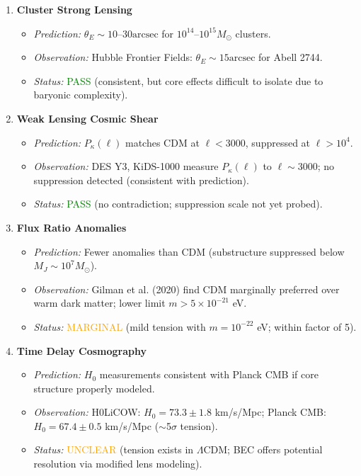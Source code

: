 \documentclass[11pt,a4paper]{article}
\newcommand{\Msun}{\ensuremath{M_\odot}}
\newcommand{\arcsec}{\ensuremath{\text{arcsec}}}
\theoremstyle{definition}
\theoremstyle{remark}
\begin{document}
\begin{enumerate}[leftmargin=*, label=\textbf{Criterion \arabic*:}, itemsep=0.5em]
\item \textbf{Cluster Strong Lensing}
\begin{itemize}[leftmargin=*, itemsep=0.2em]
\item \emph{Prediction:} $\theta_E \sim 10$--$30\arcsec$ for $10^{14}$--$10^{15} \Msun$ clusters.
\item \emph{Observation:} Hubble Frontier Fields: $\theta_E \sim 15\arcsec$ for Abell 2744.
\item \emph{Status:} \textcolor{green}{PASS} (consistent, but core effects difficult to isolate due to baryonic complexity).
\end{itemize}

\item \textbf{Weak Lensing Cosmic Shear}
\begin{itemize}[leftmargin=*, itemsep=0.2em]
\item \emph{Prediction:} $P_\kappa(\ell)$ matches CDM at $\ell < 3000$, suppressed at $\ell > 10^4$.
\item \emph{Observation:} DES Y3, KiDS-1000 measure $P_\kappa(\ell)$ to $\ell \sim 3000$; no suppression detected (consistent with prediction).
\item \emph{Status:} \textcolor{green}{PASS} (no contradiction; suppression scale not yet probed).
\end{itemize}

\item \textbf{Flux Ratio Anomalies}
\begin{itemize}[leftmargin=*, itemsep=0.2em]
\item \emph{Prediction:} Fewer anomalies than CDM (substructure suppressed below $M_J \sim 10^7 \Msun$).
\item \emph{Observation:} Gilman et al. (2020) find CDM marginally preferred over warm dark matter; lower limit $m > 5 \times 10^{-21}$ eV.
\item \emph{Status:} \textcolor{orange}{MARGINAL} (mild tension with $m = 10^{-22}$ eV; within factor of 5).
\end{itemize}

\item \textbf{Time Delay Cosmography}
\begin{itemize}[leftmargin=*, itemsep=0.2em]
\item \emph{Prediction:} $H_0$ measurements consistent with Planck CMB if core structure properly modeled.
\item \emph{Observation:} H0LiCOW: $H_0 = 73.3 \pm 1.8$ km/s/Mpc; Planck CMB: $H_0 = 67.4 \pm 0.5$ km/s/Mpc ($\sim$5$\sigma$ tension).
\item \emph{Status:} \textcolor{orange}{UNCLEAR} (tension exists in $\Lambda$CDM; BEC offers potential resolution via modified lens modeling).
\end{itemize}

\end{enumerate}
\end{document}
